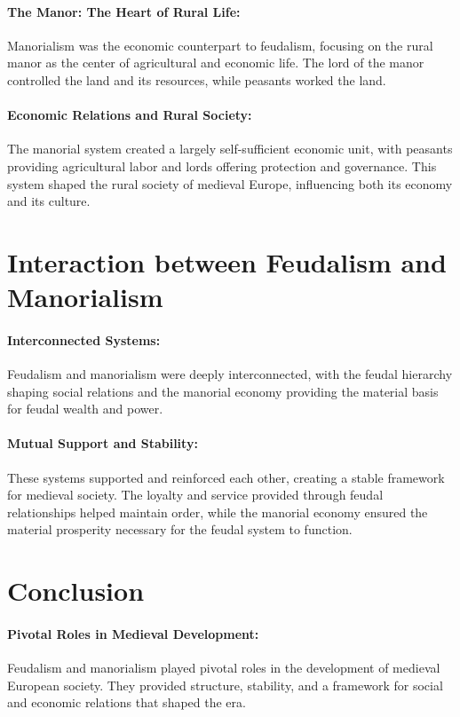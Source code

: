 \documentclass[a4paper,12pt]{book}
\begin{document}
\paragraph{The Manor: The Heart of Rural Life:}
Manorialism was the economic counterpart to feudalism, focusing on the rural manor as the center of agricultural and economic life. The lord of the manor controlled the land and its resources, while peasants worked the land.

\paragraph{Economic Relations and Rural Society:}
The manorial system created a largely self-sufficient economic unit, with peasants providing agricultural labor and lords offering protection and governance. This system shaped the rural society of medieval Europe, influencing both its economy and its culture.

\section*{Interaction between Feudalism and Manorialism}

\paragraph{Interconnected Systems:}
Feudalism and manorialism were deeply interconnected, with the feudal hierarchy shaping social relations and the manorial economy providing the material basis for feudal wealth and power.

\paragraph{Mutual Support and Stability:}
These systems supported and reinforced each other, creating a stable framework for medieval society. The loyalty and service provided through feudal relationships helped maintain order, while the manorial economy ensured the material prosperity necessary for the feudal system to function.

\section*{Conclusion}

\paragraph{Pivotal Roles in Medieval Development:}
Feudalism and manorialism played pivotal roles in the development of medieval European society. They provided structure, stability, and a framework for social and economic relations that shaped the era.
\end{document}
